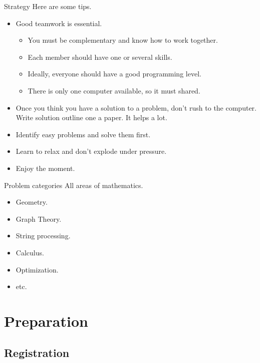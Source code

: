 \documentclass{beamer}
\begin{document}
\begin{frame}{Strategy}
Here are some tips.
\begin{itemize}
  \justifying
  \item Good teamwork is essential.
    \begin{itemize}
      \item You must be complementary and know how to work together.
      \item Each member should have one or several skills.
      \item Ideally, everyone should have a good programming level.
      \item There is only one computer available, so it must shared.
    \end{itemize}
  \item Once you think you have a solution to a problem, don't rush to the computer. Write solution outline one a paper. It helps a lot.
  \item Identify easy problems and solve them first.
  \item Learn to relax and don't explode under pressure.
  \item Enjoy the moment.
\end{itemize}
\end{frame}

\begin{frame}{Problem categories}
All areas of mathematics.
\begin{itemize}
  \justifying
  \item Geometry.
  \item Graph Theory.
  \item String processing.
  \item Calculus.
  \item Optimization.
  \item etc.
\end{itemize}
\end{frame}

\section{Preparation}

\subsection{Registration}
\end{document}
